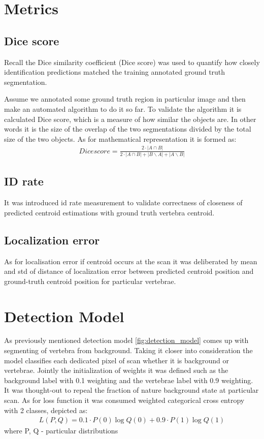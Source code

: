 \section{Metrics}
\subsection{Dice score}
Recall the \cite{Thada2013} Dice similarity coefficient (Dice score) was used to quantify how closely identification predictions matched the training annotated ground truth segmentation. 

Assume we annotated some ground truth region in particular image and then make an automated algorithm to do it so far. To validate the algorithm it is calculated Dice score, which is a measure of how similar the objects are. In other words it is the size of the overlap of the two segmentations divided by the total size of the two objects. As for mathematical representation it is formed as:
\begin{align*}
  Dice score = \frac{2\cdot|A\cap B|}{2\cdot|A\cap B| + |B\backslash A| + |A\backslash B|}
\end{align*}

\subsection{ID rate}
It was introduced id rate measurement to validate correctness of closeness of predicted centroid estimations with ground truth vertebra centroid. 

\subsection{Localization error}
As for localisation error if centroid occurs at the scan it was deliberated by mean and std of distance of localization error between predicted centroid position and ground-truth centroid position for particular vertebrae. 


\section{Detection Model}
As previously mentioned detection model \ref{fig:detection_model} comes up with segmenting of vertebra from background. Taking it closer into consideration the model classifies each dedicated pixel of scan whether it is background or vertebrae. Jointly the initialization of weights it was  defined such as the background label with 0.1 weighting and the vertebrae label with 0.9 weighting. It was thought-out to repeal the fraction of nature background state at particular scan. As for loss function it was consumed \cite{Zhang2018} weighted categorical cross entropy with 2 classes, depicted as:
\begin{align*}
 L(P, Q) = 0.1 \cdot P(0)\log Q(0) + 0.9 \cdot P(1)\log Q(1)
\end{align*}
where P, Q - particular distributions 

